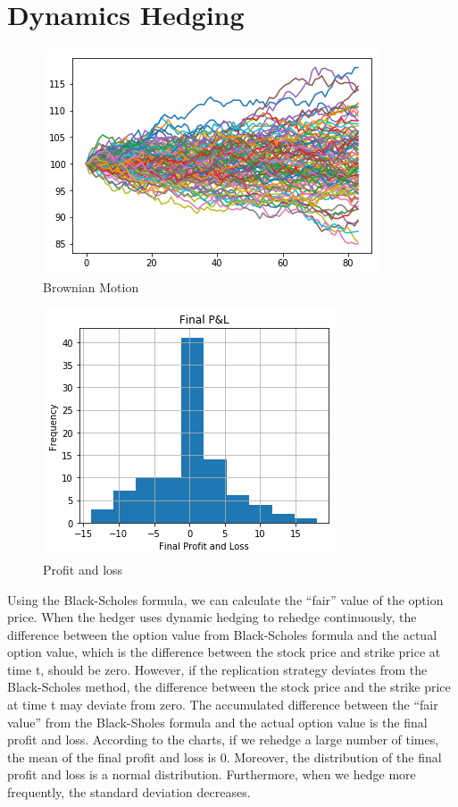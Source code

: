 \documentclass[fleqn,12pt]{SelfArx}
\def\mystyle{decsci}
\begin{document}
\section{Dynamics Hedging}

\begin{figure}[ht]\centering
	\includegraphics{Brownian}
	\caption{Brownian Motion}
\end{figure}

\begin{figure}[ht]\centering
	\includegraphics{PL}
	\caption{Profit and loss}
\end{figure}

Using the Black-Scholes formula, we can calculate the “fair” value of the option price. When the hedger uses dynamic hedging to rehedge continuously, the difference between the option value from Black-Scholes formula and the actual option value, which is the difference between the stock price and strike price at time t, should be zero. However, if the replication strategy deviates from the Black-Scholes method, the difference between the stock price and the strike price at time t may deviate from zero. The accumulated difference between the “fair value” from the Black-Sholes formula and the actual option value is the final profit and loss. According to the charts, if we rehedge a large number of times, the mean of the final profit and loss is 0. Moreover, the distribution of the final profit and loss is a normal distribution. Furthermore, when we hedge more frequently, the standard deviation decreases.

\end{document}
